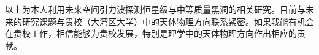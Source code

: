\documentclass[12pt,a4paper,sans]{article}%
\begin{document}
\begin{CJK}{UTF8}{gbsn}
	以上为本人利用未来空间引力波探测恒星级与中等质量黑洞的相关研究。目前与未来的研究课题与贵校（大湾区大学）中的天体物理方向联系紧密。如果我能有机会在贵校工作，相信能够为贵校发展，特别是理学中的天体物理方向作出相应的贡献。





\end{CJK}
\end{document}
